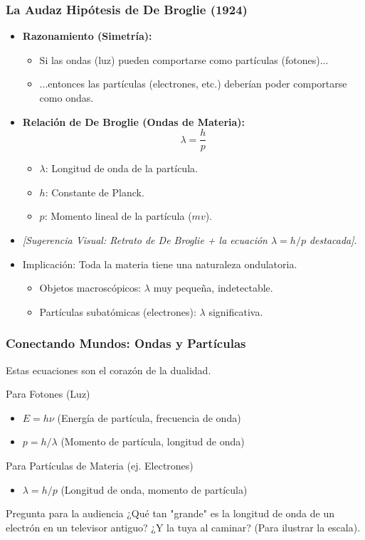 \documentclass{beamer}
\begin{document}
	\begin{frame}
		\frametitle{La Audaz Hipótesis de De Broglie (1924)}
		\begin{itemize}
			\item \textbf{Razonamiento (Simetría):}
			\begin{itemize}
				\item Si las ondas (luz) pueden comportarse como partículas (fotones)...
				\item ...entonces las partículas (electrones, etc.) deberían poder comportarse como ondas.
			\end{itemize} \pause
			\item \textbf{Relación de De Broglie (Ondas de Materia):}
			\[ \lambda = \frac{h}{p} \]
			\begin{itemize}
				\item $\lambda$: Longitud de onda de la partícula.
				\item $h$: Constante de Planck.
				\item $p$: Momento lineal de la partícula ($mv$).
			\end{itemize} \pause
			\item \textit{[Sugerencia Visual: Retrato de De Broglie + la ecuación $\lambda = h/p$ destacada]}. \pause
			\item Implicación: Toda la materia tiene una naturaleza ondulatoria.
			\begin{itemize}
				\item Objetos macroscópicos: $\lambda$ muy pequeña, indetectable.
				\item Partículas subatómicas (electrones): $\lambda$ significativa.
			\end{itemize}
		\end{itemize}
	\end{frame}
	
	\begin{frame}
		\frametitle{Conectando Mundos: Ondas y Partículas}
		Estas ecuaciones son el corazón de la dualidad.
		\pause
		\begin{block}{Para Fotones (Luz)}
			\begin{itemize}
				\item $E = h\nu$ (Energía de partícula, frecuencia de onda)
				\item $p = h/\lambda$ (Momento de partícula, longitud de onda)
			\end{itemize}
		\end{block}
		\pause
		\begin{block}{Para Partículas de Materia (ej. Electrones)}
			\begin{itemize}
				\item $\lambda = h/p$ (Longitud de onda, momento de partícula)
			\end{itemize}
		\end{block}
		\pause
		\begin{alertblock}{Pregunta para la audiencia}
			¿Qué tan "grande" es la longitud de onda de un electrón en un televisor antiguo? ¿Y la tuya al caminar? (Para ilustrar la escala).
		\end{alertblock}
	\end{frame}
	
\end{document}
